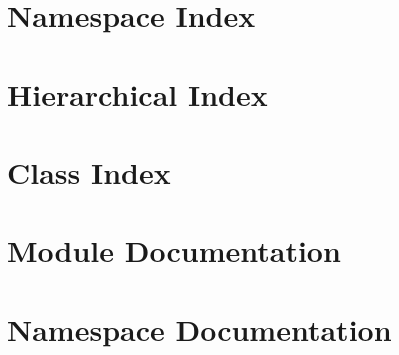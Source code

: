 \let\mypdfximage\pdfximage\def\pdfximage{\immediate\mypdfximage}\documentclass[twoside]{book}
\newcommand{\+}{\discretionary{\mbox{\scriptsize$\hookleftarrow$}}{}{}}
\begin{document}
\chapter{Namespace Index}

\chapter{Hierarchical Index}

\chapter{Class Index}

\chapter{Module Documentation}















\chapter{Namespace Documentation}



















\end{document}
